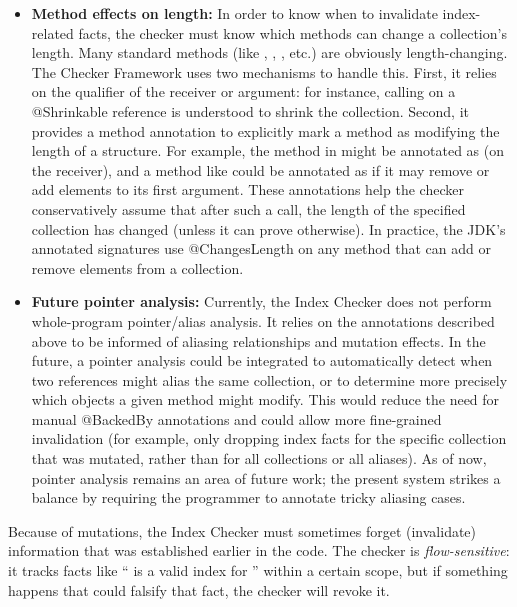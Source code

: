 \begin{itemize}
\item
  \textbf{Method effects on length:}
  In order to know when to invalidate index-related facts, the checker must know which methods
  can change a collection’s length. Many standard methods (like , ,
  , etc.) are obviously length-changing. The Checker Framework uses two mechanisms
  to handle this. First, it relies on the qualifier of the receiver or argument: for instance,
  calling  on a @Shrinkable reference is understood to shrink the collection.
  Second, it provides a method annotation  to explicitly mark a method as
  modifying the length of a structure. For example, the  method in  might
  be annotated as  (on the receiver), and a method like 
  could be annotated as  if it may remove or add elements to its
  first argument. These annotations help the checker conservatively assume that after such a call,
  the length of the specified collection has changed (unless it can prove otherwise).
  In practice, the JDK’s annotated signatures use @ChangesLength on any method that can add or
  remove elements from a collection.

\item
  \textbf{Future pointer analysis:}
  Currently, the Index Checker does not perform whole-program pointer/alias analysis.
  It relies on the annotations described above to be informed of aliasing relationships and
  mutation effects. In the future, a pointer analysis could be integrated to automatically
  detect when two references might alias the same collection, or to determine more precisely
  which objects a given method might modify. This would reduce the need for manual @BackedBy
  annotations and could allow more fine-grained invalidation (for example, only dropping index
  facts for the specific collection that was mutated, rather than for all collections or all
  aliases). As of now, pointer analysis remains an area of future work; the present system
  strikes a balance by requiring the programmer to annotate tricky aliasing cases.
\end{itemize}


Because of mutations, the Index Checker must sometimes forget (invalidate) information that was
established earlier in the code. The checker is \emph{flow-sensitive}: it tracks facts like
“ is a valid index for ” within a certain scope, but if something happens
that could falsify that fact, the checker will revoke it.


